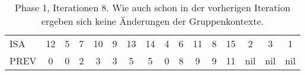 \begin{table}[H]
\begin{adjustbox}{max width=\textwidth}
\begin{tabular}{lccccccccccccccc}
\multicolumn{1}{l|}{ISA}     & 12                      & 5  & 7                       & 10                         & 9                           & 13                        & 14                         & 4                         & 6                        & 11 & 8                       & 15  & 2   & 3   & 1   \\
\multicolumn{1}{l|}{PREV}    & 0                       & 0  & 2                       & 3                          & 3                           & 5                         & 5                          & \cellcolor[HTML]{\red}0 & 8                        & 9  & 9                       & 11  & nil & nil & nil
\end{tabular}
\end{adjustbox}

\caption[Phase 1, Iterationen 8]{Phase 1, Iterationen 8. Wie auch schon in der vorherigen Iteration ergeben sich keine Änderungen der Gruppenkontexte.}
\label{table_complex_example_1_8} 
\end{table}

